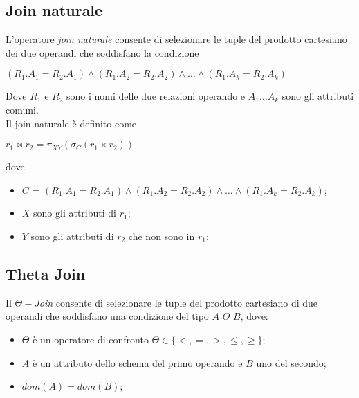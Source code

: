 \subsection{Join naturale}
L'operatore \emph{join naturale} consente di selezionare le tuple del prodotto cartesiano
dei due operandi che soddisfano la condizione
\begin{center}
\begin{math}
 (R_1.A_1 = R_2.A_1) \wedge (R_1.A_2 = R_2.A_2) \wedge \ldots \wedge (R_1.A_k = R_2.A_k)
\end{math}
\end{center}
Dove $R_1$ e $R_2$ sono i nomi delle due relazioni operando e $A_1 \ldots A_k$ sono gli 
attributi comuni.\\
Il join naturale è definito come
\begin{center}
\begin{math}
 r_1\bowtie r_2 = \pi_{XY}(\sigma_{C}(r_1 \times r_2))
\end{math}
\end{center}
dove
\begin{itemize}
 \item $C$ = $(R_1.A_1 = R_2.A_1) \wedge (R_1.A_2 = R_2.A_2) \wedge \ldots \wedge (R_1.A_k = R_2.A_k)$;
 \item $X$ sono gli attributi di $r_1$;
 \item $Y$ sono gli attributi di $r_2$ che non sono in $r_1$;
\end{itemize}

\subsection{Theta Join}
Il \emph{$\Theta-$Join} consente di selezionare le tuple del prodotto cartesiano
di due operandi che soddisfano una condizione del tipo $A$ $\Theta$ $B$, dove:
\begin{itemize}
 \item $\Theta$ è un operatore di confronto $\Theta \in \{<, =, >, \leq, \geq\}$;
 \item $A$ è un attributo dello schema del primo operando e $B$ uno del secondo;
 \item $dom(A) = dom(B)$;
\end{itemize}




